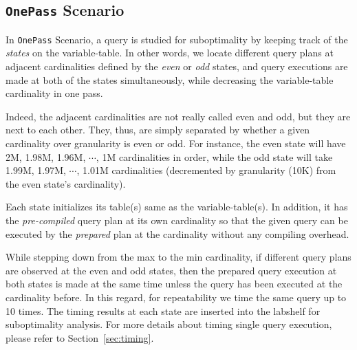 
\subsection{{\tt OnePass} Scenario}\label{sec:onepass}

In {\tt OnePass} Scenario, a query is studied for suboptimality by keeping track 
of the {\em states} on the variable-table. 
In other words, we locate different query plans at adjacent cardinalities 
defined by the {\em even} or {\em odd} states, 
and query executions are made at both of the states simultaneously, 
while decreasing the variable-table cardinality in one pass. 

Indeed, the adjacent cardinalities are not really called even and odd, 
but they are next to each other. 
They, thus, are simply separated by whether a given cardinality over 
granularity is even or odd. 
For instance, the even state will have 2M, 1.98M, 1.96M, $\cdots$, 1M cardinalities 
in order, while the odd state will take 1.99M, 1.97M, $\cdots$, 1.01M cardinalities 
(decremented by granularity (10K) from the even state's cardinality). 

Each state initializes its table(s) same as the variable-table(s). 
In addition, it has the {\em pre-compiled} query plan at its own cardinality 
so that the given query can be executed by the {\em prepared} plan at the cardinality 
without any compiling overhead.

While stepping down from the max to the min cardinality, 
if different query plans are observed at the even and odd states, 
then the prepared query execution at both states is made at the same time 
unless the query has been executed at the cardinality before. 
In this regard, for repeatability we time the same query up to 10 times. 
The timing results at each state are inserted into the labshelf for 
suboptimality analysis. 
For more details about timing single query execution, 
please refer to Section~\ref{sec:timing}.

